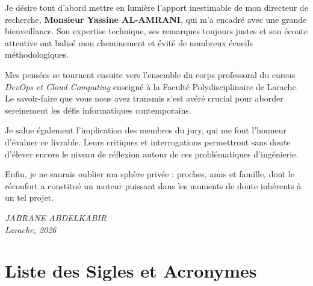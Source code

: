 \documentclass[final]{report}
\begin{document}
Je désire tout d'abord mettre en lumière l'apport inestimable de mon directeur de recherche, \textbf{Monsieur Yassine AL-AMRANI}, qui m'a encadré avec une grande bienveillance. Son expertise technique, ses remarques toujours justes et son écoute attentive ont balisé mon cheminement et évité de nombreux écueils méthodologiques.
 
Mes pensées se tournent ensuite vers l'ensemble du corps professoral du cursus \textit{DevOps et Cloud Computing} enseigné à la Faculté Polydisciplinaire de Larache. Le savoir-faire que vous nous avez transmis s'est avéré crucial pour aborder sereinement les défis informatiques contemporains.
 
Je salue également l'implication des membres du jury, qui me font l'honneur d'évaluer ce livrable. Leurs critiques et interrogations permettront sans doute d'élever encore le niveau de réflexion autour de ces problématiques d'ingénierie.
 
Enfin, je ne saurais oublier ma sphère privée : proches, amis et famille, dont le réconfort a constitué un moteur puissant dans les moments de doute inhérents à un tel projet.
 
\vspace{1cm}
\begin{flushright}
  \textit{JABRANE ABDELKABIR}\\
  \textit{Larache, 2026}
\end{flushright}
 
\newpage
 
\tableofcontents
\newpage
\listoffigures
\newpage
\listoftables
\newpage
 
\chapter*{Liste des Sigles et Acronymes}
\thispagestyle{fancy}
 
\end{document}
